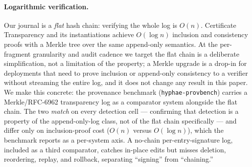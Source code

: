 \paragraph{Logarithmic verification.} Our journal is a \emph{flat}
hash chain: verifying the whole log is $O(n)$. Certificate
Transparency \citep{laurie2014ct} and its instantiations achieve
$O(\log n)$ inclusion and consistency proofs with a Merkle tree
over the same append-only semantics. At the per-fragment
granularity and audit cadence we target the flat chain is a
deliberate simplification, not a limitation of the property; a
Merkle upgrade is a drop-in for deployments that need to prove
inclusion or append-only consistency to a verifier without
streaming the entire log, and it does not change any result in
this paper. We make this concrete: the provenance benchmark
(\texttt{hyphae-provbench}) carries a Merkle/RFC-6962 transparency
log as a comparator system alongside the flat chain. The two
\emph{match} on every detection cell --- confirming that detection
is a property of the append-only-log class, not of the flat chain
specifically --- and differ only on inclusion-proof cost ($O(n)$
versus $O(\log n)$), which the benchmark reports as a per-system
axis. A no-chain per-entry-signature log, included as a third
comparator, catches in-place edits but misses deletion, reordering,
replay, and rollback, separating ``signing'' from ``chaining.''

